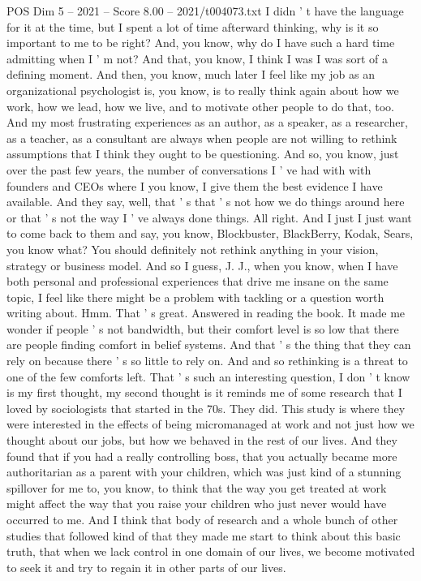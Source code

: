 \begin{textsample}{POS Dim 5 – 2021 – Score 8.00 – 2021/t004073.txt}
I didn ' t have the language for it at the time, but I spent a lot of time afterward thinking, why is it so important to me to be right?
And, you know, why do I have such a hard time admitting when I ' m not?
And that, you know, I think I was I was sort of a defining moment.
And then, you know, much later I feel like my job as an organizational psychologist is, you know, is to really think again about how we work, how we lead, how we live, and to motivate other people to do that, too.
And my most frustrating experiences as an author, as a speaker, as a researcher, as a teacher, as a consultant are always when people are not willing to rethink assumptions that I think they ought to be questioning.
And so, you know, just over the past few years, the number of conversations I ' ve had with with founders and CEOs where I you know, I give them the best evidence I have available.
And they say, well, that ' s that ' s not how we do things around here or that ' s not the way I ' ve always done things.
All right.
And I just I just want to come back to them and say, you know, Blockbuster, BlackBerry, Kodak, Sears, you know what?
You should definitely not rethink anything in your vision, strategy or business model.
And so I guess, J.
J., when you know, when I have both personal and professional experiences that drive me insane on the same topic, I feel like there might be a problem with tackling or a question worth writing about.
Hmm.
That ' s great.
Answered in reading the book.
It made me wonder if people ' s not bandwidth, but their comfort level is so low that there are people finding comfort in belief systems.
And that ' s the thing that they can rely on because there ' s so little to rely on.
And and so rethinking is a threat to one of the few comforts left.
That ' s such an interesting question, I don ' t know is my first thought, my second thought is it reminds me of some research that I loved by sociologists that started in the 70s.
They did.
This study is where they were interested in the effects of being micromanaged at work and not just how we thought about our jobs, but how we behaved in the rest of our lives.
And they found that if you had a really controlling boss, that you actually became more authoritarian as a parent with your children, which was just kind of a stunning spillover for me to, you know, to think that the way you get treated at work might affect the way that you raise your children who just never would have occurred to me.
And I think that body of research and a whole bunch of other studies that followed kind of that they made me start to think about this basic truth, that when we lack control in one domain of our lives, we become motivated to seek it and try to regain it in other parts of our lives.

\end{textsample}
